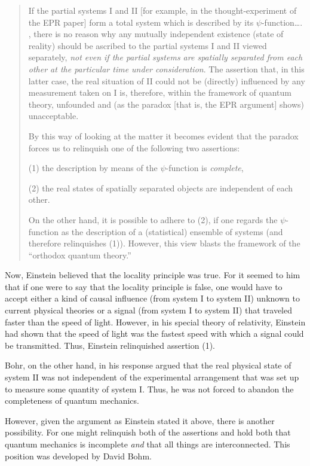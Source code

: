 \documentclass[11pt]{memoir}
\begin{document}
\begin{quote}
If the partial systems I and II {[}for example, in the
thought-experiment of the EPR paper{]} form a total system which is
described by its $\psi$-function\ldots. , there is no reason why any mutually
independent existence (state of reality) should be ascribed to the
partial systems I and II viewed separately, \emph{not even if the
partial systems are spatially separated from each other at the
particular time under consideration}. The assertion that, in this latter
case, the real situation of II could not be (directly) influenced by any
measurement taken on I is, therefore, within the framework of quantum
theory, unfounded and (as the paradox {[}that is, the EPR argument{]}
shows) unacceptable.

By this way of looking at the matter it becomes evident that the paradox
forces us to relinquish one of the following two assertions:

(1) the description by means of the $\psi$-function is \emph{complete},

(2) the real states of spatially separated objects are independent of
each other.

On the other hand, it is possible to adhere to (2), if one regards the
$\psi$-function as the description of a (statistical) ensemble of systems
(and therefore relinquishes (1)). However, this view blasts the
framework of the ``orthodox quantum theory.''
\end{quote}

Now, Einstein believed that the locality principle was true. For it
seemed to him that if one were to say that the locality principle is
false, one would have to accept either a kind of causal influence (from
system I to system II) unknown to current physical theories or a signal
(from system I to system II) that traveled faster than the speed of
light. However, in his special theory of relativity, Einstein had shown
that the speed of light was the fastest speed with which a signal could
be transmitted. Thus, Einstein relinquished assertion (1).

Bohr, on the other hand, in his response argued that the real physical
state of system II was not independent of the experimental arrangement
that was set up to measure some quantity of system I. Thus, he was not
forced to abandon the completeness of quantum mechanics.

However, given the argument as Einstein stated it above, there is
another possibility. For one might relinquish both of the assertions and
hold both that quantum mechanics is incomplete \emph{and} that all
things are interconnected. This position was developed by David Bohm.
\end{document}
